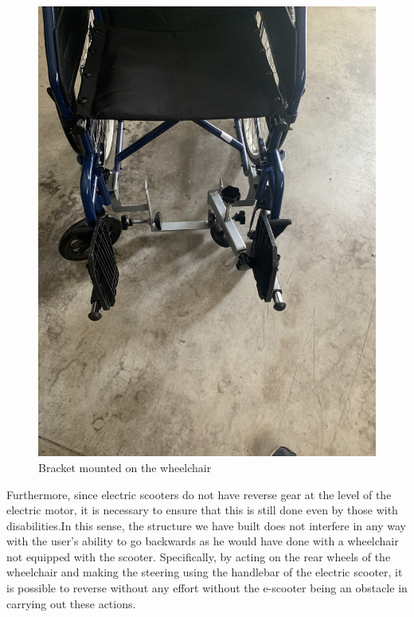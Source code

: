 \documentclass[binding=0.6cm,LaM,noexaminfo]{sapthesis}
\begin{document}
\begin{figure}[!htp]
\begin{minipage}[t]{.5\textwidth}
    \centering\includegraphics[width=.95\textwidth]{images/finished_project/IMG_3765.jpg}
    \end{minipage}
    \caption{Bracket mounted on the wheelchair}
    \label{fig:brack_mounted}
\end{figure}

Furthermore, since electric scooters do not have reverse gear at the level of the electric motor, it is necessary to ensure that this is still done even by those with disabilities.In this sense, the structure we have built does not interfere in any way with the user's ability to go backwards as he would have done with a wheelchair not equipped with the scooter. Specifically, by acting on the rear wheels of the wheelchair and making the steering using the handlebar of the electric scooter, it is possible to reverse without any effort without the e-scooter being an obstacle in carrying out these actions.
\end{document}

